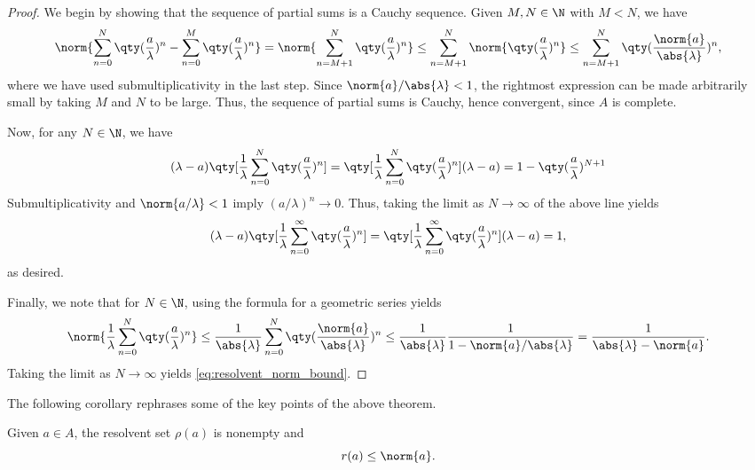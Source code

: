 \begin{proof}
We begin by showing that the sequence of partial sums is a Cauchy sequence. Given $M,N \in \N$ with $M < N$, we have
\begin{equation}
\norm{\sum_{n=0}^N \qty(\frac{a}{\lambda})^n - \sum_{n = 0}^M \qty(\frac{a}{\lambda})^n} = \norm{\sum_{n=M+1}^N \qty(\frac{a}{\lambda})^n} \leq \sum_{n=M+1}^N \norm{\qty(\frac{a}{\lambda})^n} \leq \sum_{n=M+1}^N \qty(\frac{\norm{a}}{\abs{\lambda}})^n,
\end{equation}
where we have used submultiplicativity in the last step. Since $\norm{a}/\abs{\lambda} < 1$, the rightmost expression can be made arbitrarily small by taking $M$ and $N$ to be large. Thus, the sequence of partial sums is Cauchy, hence convergent, since $A$ is complete.

Now, for any $N \in \N$, we have
\begin{equation}
(\lambda - a)\qty[\frac{1}{\lambda}\sum_{n=0}^N \qty(\frac{a}{\lambda})^n] = \qty[\frac{1}{\lambda}\sum_{n=0}^N \qty(\frac{a}{\lambda})^n](\lambda - a) = 1 - \qty(\frac{a}{\lambda})^{N+1}
\end{equation}
Submultiplicativity and $\norm{a/\lambda} < 1$ imply $(a/\lambda)^n \rightarrow 0$. Thus, taking the limit as $N \rightarrow \infty$ of the above line yields
\begin{equation}
(\lambda - a)\qty[\frac{1}{\lambda}\sum_{n=0}^\infty \qty(\frac{a}{\lambda})^n] = \qty[\frac{1}{\lambda}\sum_{n=0}^\infty \qty(\frac{a}{\lambda})^n](\lambda - a) = 1,
\end{equation}
as desired.

Finally, we note that for $N \in \N$, using the formula for a geometric series yields
\begin{equation}
\norm{\frac{1}{\lambda}\sum_{n=0}^N \qty(\frac{a}{\lambda})^n}  \leq \frac{1}{\abs{\lambda}}\sum_{n=0}^N \qty(\frac{\norm{a}}{\abs{\lambda}})^n \leq  \frac{1}{\abs{\lambda}}\frac{1}{1 - \norm{a}/\abs{\lambda}} = \frac{1}{\abs{\lambda} - \norm{a}}.
\end{equation}
Taking the limit as $N \rightarrow \infty$ yields \eqref{eq:resolvent_norm_bound}.
\end{proof}

The following corollary rephrases some of the key points of the above theorem.

\begin{corollary}
Given $a \in A$, the resolvent set $\rho(a)$ is nonempty and
\begin{equation}
r(a) \leq \norm{a}.
\end{equation}
\end{corollary}


